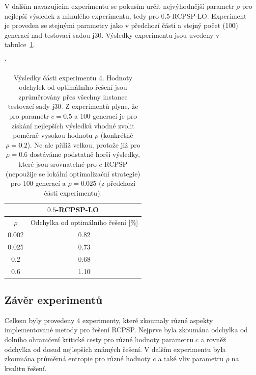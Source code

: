 \documentclass[a4paper,12pt]{article}
\begin{document}
V dalším navazujícím experimentu se pokusím určit nejvýhodnější parametr $\rho$ pro nejlepší výsledek z minulého experimentu, tedy pro
0.5-RCPSP-LO. Experiment je proveden se stejnými parametry jako v předchozí části a stejný počet (100) generací nad testovací sadou j30. 
Výsledky experimentu jsou uvedeny v tabulce~\ref{tab:j30rho}. 

\begin{table}[ht!]
  \catcode`
\begin{center}
  \begin{tabular}{ | c | c | }
    \hline
    \multicolumn{2}{|c|}{$0.5$\textbf{-RCPSP-LO}} \\
    \hline
    $\rho$ & Odchylka od optimálního řešení [\%] \\ \hline
    0.002 & 0.82 \\ \hline
    0.025 & 0.73 \\ \hline
    0.2 & 0.68 \\ \hline
    0.6 & 1.10 \\ \hline
  \end{tabular}
\end{center}
\caption{Výsledky části experimentu 4. Hodnoty odchylek od optimálního řešení jsou zprůměrovány 
přes všechny instance testovací sady j30. Z experimentů plyne, že pro parametr $c = 0.5$ a 100 generací je
pro získání nejlepších výsledků vhodné zvolit poměrně vysokou hodnotu $\rho$ (konkrétně $\rho = 0.2$). Ne ale příliž 
velkou, protože již pro $\rho = 0.6$ dostáváme podstatně horší výsledky, které jsou srovnatelné pro $c$-RCPSP (nepoužije se lokální optimalizační strategie)
pro 100 generací a $\rho = 0.025$ (z předchozí části experimentu).}
\label{tab:j30rho}
\end{table}

\subsection{Závěr experimentů}
Celkem byly provedeny 4 experimenty, které zkoumaly různé aspekty implementované metody pro řešení RCPSP. 
Nejprve byla zkoumána odchylka od dolního ohraničení kritické cesty pro různé hodnoty parametru $c$
a rovněž odchylka od dosud nejlepších známých řešení. V dalším experimentu byla zkoumána průměrná entropie
pro různé hodnoty $c$ a také vliv parametru $\rho$ na kvalitu řešení.
\end{document}
